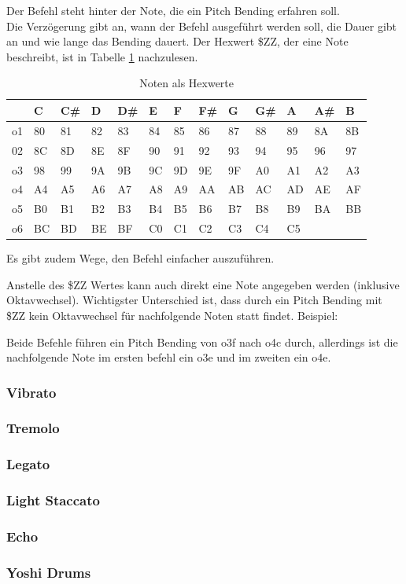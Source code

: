 Der Befehl steht hinter der Note, die ein Pitch Bending erfahren soll. \\
Die Verzögerung gibt an, wann der Befehl ausgeführt werden soll, die Dauer gibt an und wie lange das Bending dauert. Der Hexwert \$ZZ, der eine Note beschreibt, ist in Tabelle \ref{Noten} nachzulesen.

\begin{table}
\begin{tabularx}{\textwidth}{|l|X|X|X|X|X|X|X|X|X|X|X|X|}
	\hline
	& C & C\# & D & D\# & E & F & F\# & G & G\# & A & A\# & B   \\
	\hline
	o1 & 80 & 81 & 82 & 83 & 84 & 85 & 86 & 87 & 88 & 89 & 8A & 8B \\
	\hline
	02 & 8C & 8D & 8E & 8F & 90 & 91 & 92 & 93 & 94 & 95 & 96 & 97 \\
	\hline
	o3 & 98 & 99 & 9A & 9B & 9C & 9D & 9E & 9F & A0 & A1 & A2 & A3 \\
	\hline
	o4 & A4 & A5 & A6 & A7 & A8 & A9 & AA & AB & AC & AD & AE & AF \\
	\hline
	o5 & B0 & B1 & B2 & B3 & B4 & B5 & B6 & B7 & B8 & B9 & BA & BB \\
	\hline
	o6 & BC & BD & BE & BF & C0 & C1 & C2 & C3 & C4 & C5 & & \\
	\hline
\end{tabularx}
\caption{Noten als Hexwerte}
\label{Noten}
\end{table}


Es gibt zudem Wege, den Befehl einfacher auszuführen.

\bigskip

Anstelle des \$ZZ Wertes kann auch direkt eine Note angegeben werden (inklusive Oktavwechsel). Wichtigster Unterschied ist, dass durch ein Pitch Bending mit \$ZZ kein Oktavwechsel für nachfolgende Noten statt findet. Beispiel:

\medskip



\medskip

Beide Befehle führen ein Pitch Bending von o3f nach o4c durch, allerdings ist die nachfolgende Note im ersten befehl ein o3e und im zweiten ein o4e. \\

\subsubsection{Vibrato}
\subsubsection{Tremolo}
\subsubsection{Legato}
\subsubsection{Light Staccato}
\subsubsection{Echo}
\subsubsection{Yoshi Drums}